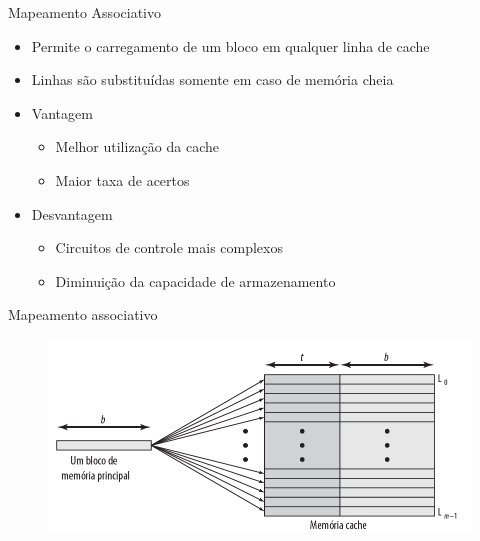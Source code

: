 \documentclass[aspectratio=169,
				xcolor=table]{beamer}
\begin{document}
	\begin{frame}{Mapeamento Associativo}
		\begin{itemize}
			\item Permite o carregamento de um bloco em qualquer linha de cache
			\item Linhas são substituídas somente em caso de memória cheia
			\item Vantagem
			\begin{itemize}
				\item Melhor utilização da cache
				\item Maior taxa de acertos
			\end{itemize}
			\item Desvantagem
			\begin{itemize}
				\item Circuitos de controle mais complexos
				\item Diminuição da capacidade de armazenamento
			\end{itemize}
		\end{itemize}
	\end{frame}

	\begin{frame}{Mapeamento associativo}
		\begin{figure}[hbtp]
			\centering
			\includegraphics[height=0.8\textheight, keepaspectratio]{../figs/cap06/associativo.png}
		\end{figure}		
	\end{frame}	
	
\end{document}
